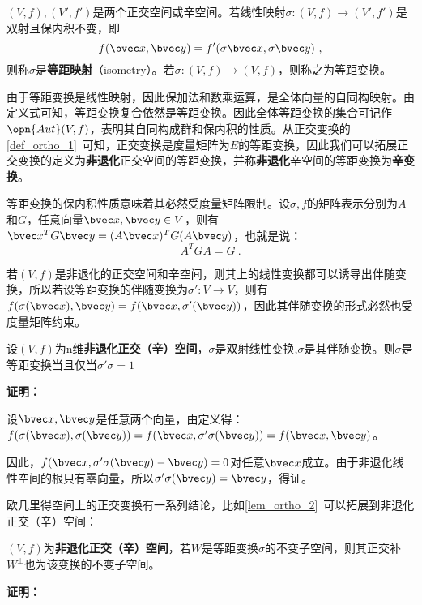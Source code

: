 

\begin{definition}{}
$(V,f),(V',f')$是两个正交空间或辛空间。若线性映射$\sigma:(V,f)\rightarrow (V',f')$是双射且保内积不变，即\begin{equation}
f(\bvec x,\bvec y)=f'(\sigma \bvec x,\sigma \bvec y)~,
\end{equation}
则称$\sigma $是\textbf{等距映射}（isometry）。若$\sigma:(V,f)\rightarrow (V,f)$，则称之为等距变换。
\end{definition}
由于等距变换是线性映射，因此保加法和数乘运算，是全体向量的自同构映射。由定义式可知，等距变换复合依然是等距变换。因此全体等距变换的集合可记作$\opn{Aut}(V,f)$，表明其自同构成群和保内积的性质。从正交变换的\autoref{def_ortho_1}~可知，正交变换是度量矩阵为$E$的等距变换，因此我们可以拓展正交变换的定义为\textbf{非退化}正交空间的等距变换，并称\textbf{非退化}辛空间的等距变换为\textbf{辛变换}。

等距变换的保内积性质意味着其必然受度量矩阵限制。设$\sigma,f$的矩阵表示分别为$A$和$G$，任意向量$\bvec x,\bvec y\in V$，则有$\bvec x^{T}G\bvec y=(A\bvec x)^TG(A\bvec y)$，也就是说：
\begin{equation}
A^TGA=G~.
\end{equation}

若$(V,f)$是非退化的正交空间和辛空间，则其上的线性变换都可以诱导出伴随变换，所以若设等距变换的伴随变换为$\sigma':V\rightarrow V$，则有$f(\sigma(\bvec x),\bvec y)=f(\bvec x,\sigma'(\bvec y))$，因此其伴随变换的形式必然也受度量矩阵约束。
\begin{theorem}{}
设$(V,f)$为n维\textbf{非退化正交（辛）空间}，$\sigma$是双射线性变换,$\sigma$是其伴随变换。则$\sigma$是等距变换当且仅当$\sigma'\sigma=1$
\end{theorem}
\textbf{证明：}

设$\bvec x,\bvec y$是任意两个向量，由定义得：$f(\sigma(\bvec x),\sigma(\bvec y))=f(\bvec x,\sigma'\sigma(\bvec y))=f(\bvec x,\bvec y)$。

因此，$f(\bvec x,\sigma'\sigma(\bvec y)-\bvec y)=0$对任意$\bvec x$成立。由于非退化线性空间的根只有零向量，所以$\sigma'\sigma(\bvec y)=\bvec y$，得证。

欧几里得空间上的正交变换有一系列结论，比如\autoref{lem_ortho_2}~可以拓展到非退化正交（辛）空间：
\begin{theorem}{}
$(V,f)$为\textbf{非退化正交（辛）空间}，若$W$是等距变换$\sigma$的不变子空间，则其正交补$W^{\bot}$也为该变换的不变子空间。
\end{theorem}
\textbf{证明：}

